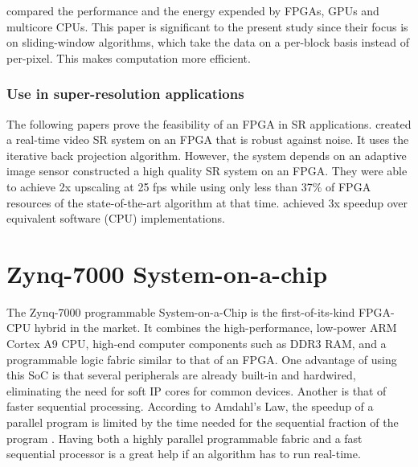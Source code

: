 \cite{Fowers2012} compared the performance and the energy expended by FPGAs, GPUs and multicore CPUs. 
This paper is significant to the present study since their focus is on sliding-window algorithms, which take the data on a per-block basis instead of per-pixel. This makes computation more efficient.

\subsubsection{Use in super-resolution applications}
The following papers prove the feasibility of an FPGA in SR applications.
\cite{Angelopoulou2009} created a real-time video SR system on an FPGA that is robust against noise.
It uses the iterative back projection algorithm. 
However, the system depends on an adaptive image sensor 
\cite{Szydzik2011} constructed a high quality SR system on an FPGA. 
They were able to achieve 2x upscaling at 25 fps while using only less than 37\% of FPGA resources of the state-of-the-art algorithm at that time.
\cite{Bowen2008} achieved 3x speedup over equivalent software (CPU) implementations.


\section{Zynq-7000 System-on-a-chip}
The Zynq-7000 programmable System-on-a-Chip is the first-of-its-kind FPGA-CPU hybrid in the market.
It combines the high-performance, low-power ARM Cortex A9 CPU, high-end computer components such as DDR3 RAM, and a programmable logic fabric similar to that of an FPGA.
One advantage of using this SoC is that several peripherals are already built-in and hardwired, eliminating the need for soft IP cores for common devices.
Another is that of faster sequential processing. 
According to Amdahl's Law, the speedup of a parallel program is limited by the time needed for the sequential fraction of the program \citep{Amdahl1967}.
Having both a highly parallel programmable fabric and a fast sequential processor is a great help if an algorithm has to run real-time.